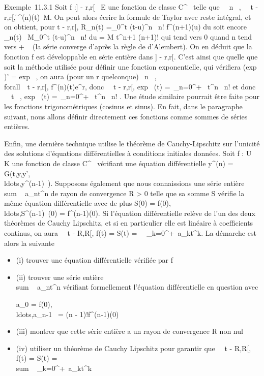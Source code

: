 \documentclass[]{article}
\begin{document}
Exemple~11.3.1 Soit f :{]} - r,r{[}\rightarrow~ E une fonction de classe
C^\infty~ telle que \forall~~n \in {}~,
\forall~~t \in{]} - r,r{[},
\f^(n)(t)\
\leq M. On peut alors écrire la formule de Taylor avec reste intégral, et
on obtient, pour t \in{]} - r,r{[}, R_n(t)
=\int  _0^t (t-u)^n~
\over n! f^(n+1)(u) du soit encore
\R_n(t)\ \leq
M\int  _0^t (t-u)^n~
\over n! du = M t^n+1 \over
(n+1)! qui tend vers 0 quand n tend vers + \infty~ (la série converge
d'après la règle de d'Alembert). On en déduit que la fonction f est
développable en série entière dans {]} - r,r{[}. C'est ainsi que quelle
que soit la méthode utilisée pour définir une fonction exponentielle,
qui vérifiera (exp~ )'
= exp~ , on aura (pour un r quelconque)
\forall~n \in {}~, \\forall~~t \in{]} -
r,r{[}, f^(n)(t)\leq e^r, donc
\forall~~t \in{]} - r,r{[},
exp~ (t) =\
\sum  _n=0^+\infty~ t^n~
\over n! et donc \forall~~t \in {}~,
exp~ (t) =\
\sum  _n=0^+\infty~ t^n~
\over n! . Une étude similaire pourrait être faite pour
les fonctions trigonométriques (cosinus et sinus). En fait, dans le
paragraphe suivant, nous allons définir directement ces fonctions comme
sommes de séries entières.

Enfin, une dernière technique utilise le théorème de Cauchy-Lipschitz
sur l'unicité des solutions d'équations différentielles à conditions
initiales données. Soit f : U \rightarrow~ K une fonction de classe C^\infty~
vérifiant une équation différentielle y^(n) =
G(t,y,y',\\ldots,y^(n-1)~).
Supposons également que nous connaissions une série entière
\\sum ~
a_nt^n de rayon de convergence R \textgreater{} 0
telle que sa somme S vérifie la même équation différentielle avec de
plus S(0) =
f(0),\\ldots,S^(n-1)~(0)
= f^(n-1)(0). Si l'équation différentielle relève de l'un des
deux théorèmes de Cauchy Lipschitz, et si en particulier elle est
linéaire à coefficients continus, on aura \forall~~t
\in{]} - R,R{[}\bigcapU, f(t) = S(t) =\
\sum ~
_k=0^+\infty~a_kt^k. La démarche est alors
la suivante

\begin{itemize}
\item
  (i) trouver une équation différentielle vérifiée par f
\item
  (ii) trouver une série entière
  \\sum ~
  a_nt^n vérifiant formellement l'équation
  différentielle en question avec

  a_0 =
  f(0),\\ldots,a_n-1~
  = (n - 1)!f^(n-1)(0)
\item
  (iii) montrer que cette série entière a un rayon de convergence R non
  nul
\item
  (iv) utiliser un théorème de Cauchy Lipschitz pour garantir que
  \forall~~t \in{]} - R,R{[}\bigcapU, f(t) = S(t)
  = \\sum ~
  _k=0^+\infty~a_kt^k
\end{itemize}
\end{document}
